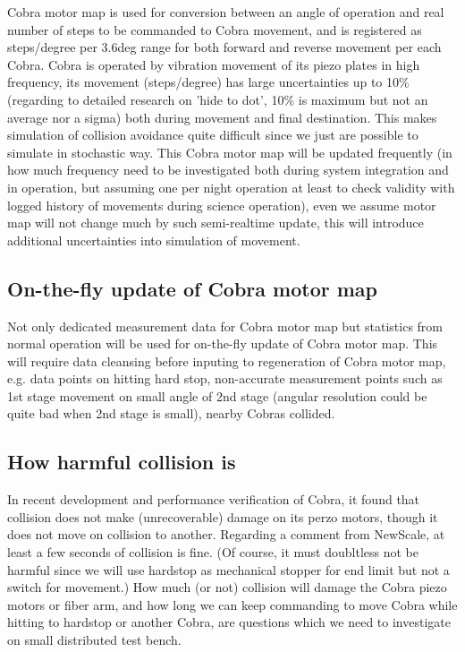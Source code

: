 \documentclass[a4paper,notitlepage]{article}
\begin{document}
Cobra motor map is used for conversion between an angle of operation and 
real number of steps to be commanded to Cobra movement, and is registered 
as steps/degree per 3.6deg range for both forward and reverse movement per 
each Cobra. Cobra is operated by vibration movement of its piezo plates in 
high frequency, its movement (steps/degree) has large uncertainties up to 
10\% (regarding to detailed research on 'hide to dot', 10\% is maximum but 
not an average nor a sigma) both during movement and final destination. 
This makes simulation of collision avoidance quite difficult since we just 
are possible to simulate in stochastic way. 
This Cobra motor map will be updated frequently (in how much frequency need 
to be investigated both during system integration and in operation, but 
assuming one per night operation at least to check validity with logged 
history of movements during science operation), even we assume motor map 
will not change much by such semi-realtime update, this will introduce 
additional uncertainties into simulation of movement. 

\subsection{On-the-fly update of Cobra motor map}

Not only dedicated measurement data for Cobra motor map but statistics from 
normal operation will be used for on-the-fly update of Cobra motor map. This 
will require data cleansing before inputing to regeneration of Cobra motor 
map, e.g. data points on hitting hard stop, non-accurate measurement points 
such as 1st stage movement on small angle of 2nd stage (angular resolution 
could be quite bad when 2nd stage is small), nearby Cobras collided. 

\subsection{How harmful collision is}

In recent development and performance verification of Cobra, it found that 
collision does not make (unrecoverable) damage on its perzo motors, though 
it does not move on collision to another. Regarding a comment from NewScale, 
at least a few seconds of collision is fine. (Of course, it must doubltless 
not be harmful since we will use hardstop as mechanical stopper for end limit 
but not a switch for movement.) How much (or not) collision will damage the 
Cobra piezo motors or fiber arm, and how long we can keep commanding to move 
Cobra while hitting to hardstop or another Cobra, are questions which we 
need to investigate on small distributed test bench.
\end{document}
